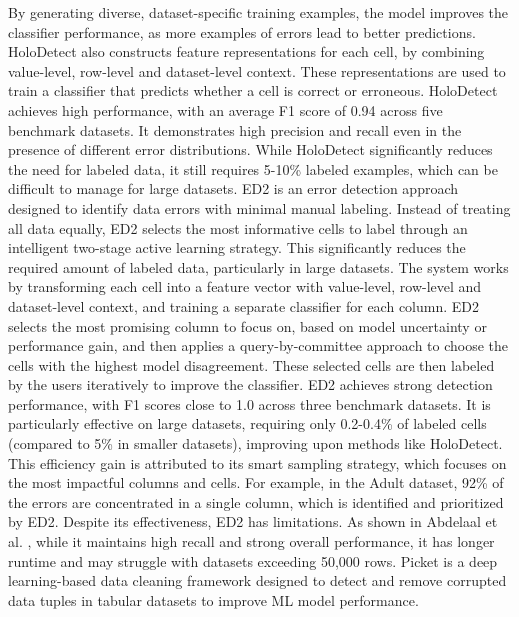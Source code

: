 By generating diverse, dataset-specific training examples, the model improves the classifier performance, as more examples of errors lead to better predictions. 
HoloDetect also constructs feature representations for each cell, by combining value-level, row-level and dataset-level context. 
These representations are used to train a classifier that predicts whether a cell is correct or erroneous. 
HoloDetect achieves high performance, with an average F1 score of 0.94 across five benchmark datasets. 
It demonstrates high precision and recall even in the presence of different error distributions. 
While HoloDetect significantly reduces the need for labeled data, it still requires 5-10\% labeled examples, which can be difficult to manage for large datasets.
\newline\newline
ED2 \cite{ED2} is an error detection approach designed to identify data errors with minimal manual labeling. 
Instead of treating all data equally, ED2 selects the most informative cells to label through an intelligent two-stage active learning strategy. 
This significantly reduces the required amount of labeled data, particularly in large datasets. 
The system works by transforming each cell into a feature vector with value-level, row-level and dataset-level context, and training a separate classifier for each column. 
ED2 selects the most promising column to focus on, based on model uncertainty or performance gain, and then applies a query-by-committee approach to choose the cells with the highest model disagreement. 
These selected cells are then labeled by the users iteratively to improve the classifier. 
ED2 achieves strong detection performance, with F1 scores close to 1.0 across three benchmark datasets. 
It is particularly effective on large datasets, requiring only 0.2-0.4\% of labeled cells (compared to 5\% in smaller datasets), improving upon methods like HoloDetect. 
This efficiency gain is attributed to its smart sampling strategy, which focuses on the most impactful columns and cells. 
For example, in the Adult dataset, 92\% of the errors are concentrated in a single column, which is identified and prioritized by ED2. 
Despite its effectiveness, ED2 has limitations. 
As shown in Abdelaal et al. \cite{REIN}, while it maintains high recall and strong overall performance, it has longer runtime and may struggle with datasets exceeding 50,000 rows.
\newline\newline
Picket \cite{PICKET} is a deep learning-based data cleaning framework designed to detect and remove corrupted data tuples in tabular datasets to improve ML model performance. 
